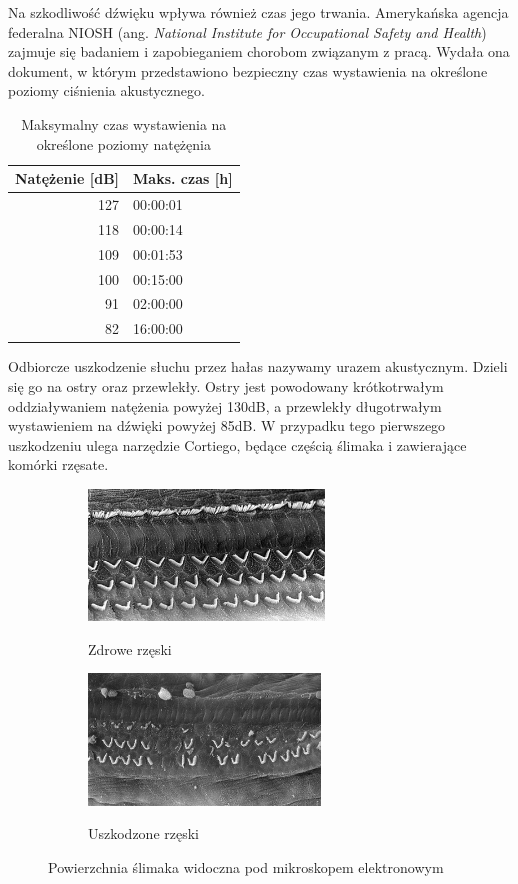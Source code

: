 Na szkodliwość dźwięku wpływa również czas jego trwania. Amerykańska agencja federalna NIOSH (ang. \textit{National Institute for Occupational Safety and Health}) zajmuje się badaniem i zapobieganiem chorobom związanym z pracą. Wydała ona dokument\cite{NIOSH}, w którym przedstawiono bezpieczny czas wystawienia na określone poziomy ciśnienia akustycznego\cite{SPLtable}.

\begin{table}[H]
	\centering
	\begin{tabular}{|r|l|}
		\hline
		Natężenie [dB] & Maks. czas [h] \\
		\hline
		\hline
		127 & 00:00:01 \\
		\hline
		118 & 00:00:14 \\
		\hline
		109 & 00:01:53 \\
		\hline
		100 & 00:15:00 \\
		\hline
		91 & 02:00:00 \\
		\hline
		82 & 16:00:00 \\
		\hline
	\end{tabular}
	\caption{Maksymalny czas wystawienia na określone poziomy natężęnia}
	\label{tab:SPLczas}
\end{table}

Odbiorcze uszkodzenie słuchu przez hałas nazywamy urazem akustycznym. Dzieli się go na ostry oraz przewlekły. Ostry jest powodowany krótkotrwałym oddziaływaniem natężenia powyżej 130dB, a przewlekły długotrwałym wystawieniem na dźwięki powyżej 85dB. W przypadku tego pierwszego uszkodzeniu ulega narzędzie Cortiego, będące częścią ślimaka i zawierające komórki rzęsate\cite{UrazyAkustyczne}.

\begin{figure}[H]
	\centering
	\begin{subfigure}{.45\textwidth}
		\centering
		\includegraphics[height=3.5cm]{zdjecia/cochlee-normale.jpg}
		\label{normal_cochlea}
		\caption{Zdrowe rzęski}
	\end{subfigure}
	\begin{subfigure}{.45\textwidth}
		\centering
		\includegraphics[height=3.5cm]{zdjecia/traumatisme-sonore-niveau-2.jpg}
		\label{damaged_cochlea}
		\caption{Uszkodzone rzęski}
	\end{subfigure}
	\caption{Powierzchnia ślimaka widoczna pod mikroskopem elektronowym\cite{RzeskiMikorskop}}
\end{figure}


